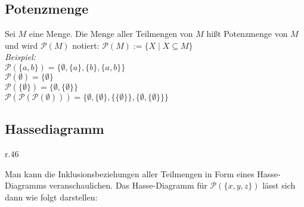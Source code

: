 \subsection*{Potenzmenge}
Sei $M$ eine Menge. Die Menge aller Teilmengen von $M$ hißt Potenzmenge von $M$ und
wird $\mathcal{P}(M)$ notiert: $\mathcal{P}(M):=\{X\mid X\subseteq M\}$\\
\emph{Beispiel:}\\
$\mathcal{P}(\{a,b\})=\{\emptyset,\{a\},\{b\},\{a,b\}\}$\\
$\mathcal{P}(\emptyset)=\{\emptyset\}$\\
$\mathcal{P}(\{\emptyset\})=\{\emptyset,\{\emptyset\}\}$\\
$\mathcal{P}(\mathcal{P}(\mathcal{P}(\emptyset)))=\{\emptyset,\{\emptyset\},\{\{\emptyset\}\},\{\emptyset,\{\emptyset\}\}\}$
\subsection*{Hassediagramm}
\begin{wrapfigure}[9]{r}{.46\linewidth}
\vspace{-20pt}
\hspace{-0pt}
\end{wrapfigure}
Man kann die Inklusionsbeziehungen aller Teilmengen in Form eines Hasse-Diagramms veranschaulichen. Das Hasse-Diagramm für $\mathcal{P}(\{x,y,z\})$ lässt sich dann wie folgt darstellen:

